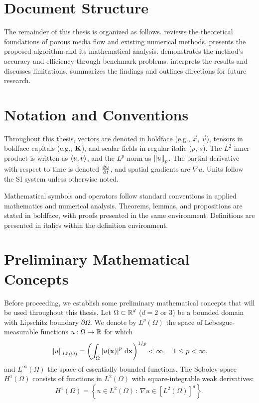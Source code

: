 \section{Document Structure}
\label{sec:introduction:structure}

The remainder of this thesis is organized as follows.  reviews the theoretical foundations of porous media flow and existing numerical methods.  presents the proposed algorithm and its mathematical analysis.  demonstrates the method's accuracy and efficiency through benchmark problems.  interprets the results and discusses limitations.  summarizes the findings and outlines directions for future research.

\section{Notation and Conventions}
\label{sec:introduction:notation}

Throughout this thesis, vectors are denoted in boldface (e.g., $\vec{x}$, $\vec{v}$), tensors in boldface capitals (e.g., $\mathbf{K}$), and scalar fields in regular italic ($p$, $s$). The $L^2$ inner product is written as $\left\langle u, v \right\rangle$, and the $L^p$ norm as $\left\| u \right\|_p$. The partial derivative with respect to time is denoted $\frac{\partial u}{\partial t}$, and spatial gradients are $\nabla u$. Units follow the SI system unless otherwise noted.

Mathematical symbols and operators follow standard conventions in applied mathematics and numerical analysis. Theorems, lemmas, and propositions are stated in boldface, with proofs presented in the same environment. Definitions are presented in italics within the definition environment.

\section{Preliminary Mathematical Concepts}
\label{sec:introduction:preliminary}

Before proceeding, we establish some preliminary mathematical concepts that will be used throughout this thesis. Let $\Omega \subset \mathbb{R}^d$ ($d = 2$ or $3$) be a bounded domain with Lipschitz boundary $\partial \Omega$. We denote by $L^p(\Omega)$ the space of Lebesgue-measurable functions $u: \Omega \to \mathbb{R}$ for which
\begin{equation}
    \left\| u \right\|_{L^p(\Omega)} = \left( \int_\Omega \left| u(\mathbf{x}) \right|^p \, \mathrm{d}\mathbf{x} \right)^{1/p} < \infty, \quad 1 \leq p < \infty,
    \label{eq:lp}
\end{equation}
and $L^\infty(\Omega)$ the space of essentially bounded functions. The Sobolev space $H^1(\Omega)$ consists of functions in $L^2(\Omega)$ with square-integrable weak derivatives:
\begin{equation}
    H^1(\Omega) = \left\{ u \in L^2(\Omega) \,:\, \nabla u \in [L^2(\Omega)]^d \right\}.
    \label{eq:h1}
\end{equation}

